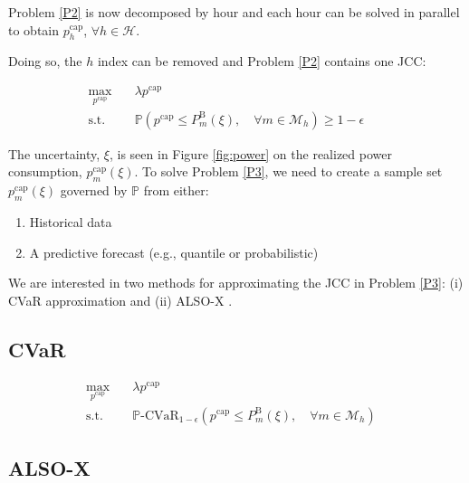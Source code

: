\documentclass{report}
\begin{document}
Problem \ref{P2} is now decomposed by hour and each hour can be solved in parallel to obtain $p_{h}^{\text{cap}}$, $\forall{h} \in \mathcal{H}$.

Doing so, the $h$ index can be removed and Problem \ref{P2} contains one JCC:

\begin{align}\label{P3}
    \max_{p^{\text{cap}}} \quad & \lambda p^{\text{cap}}                                                                                                             \\
    \text{s.t.} \quad           & \mathbb{P}  \left( p^{\text{cap}} \leq P_{m}^{\text{B}}(\xi), \quad \forall{m} \in \mathcal{M}_{h}  \right) \geq 1 - \epsilon &  &
\end{align}

The uncertainty, $\xi$, is seen in Figure \ref{fig:power} on the realized power consumption, $p_{m}^{\text{cap}}(\xi)$. To solve Problem \ref{P3}, we need to create a sample set  $p_{m}^{\text{cap}}(\xi)$ governed by $\mathbb{P}$ from either:

\begin{enumerate}
    \item Historical data
    \item A predictive forecast (e.g., quantile or probabilistic)
\end{enumerate}

We are interested in two methods for approximating the JCC in Problem \ref{P3}: (i) CVaR approximation and (ii) ALSO-X \cite{jiang2022also}.

\subsection*{CVaR}

\begin{align}\label{P4}
    \max_{p^{\text{cap}}} \quad & \lambda p^{\text{cap}}                                                                                                                \\
    \text{s.t.} \quad           & \mathbb{P}\text{-CVaR}_{1-\epsilon} \left( p^{\text{cap}} \leq P_{m}^{\text{B}}(\xi), \quad \forall{m} \in \mathcal{M}_{h}  \right) &
\end{align}

\subsection*{ALSO-X}
\end{document}
